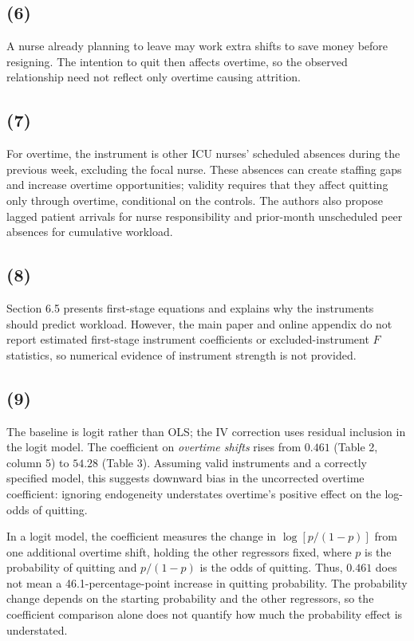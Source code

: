 \documentclass[11pt]{article}
\begin{document}
\subsection{(6)}
A nurse already planning to leave may work extra shifts to save money
before resigning. The intention to quit then affects overtime, so the
observed relationship need not reflect only overtime causing attrition.

\subsection{(7)}
For overtime, the instrument is other ICU nurses' scheduled absences
during the previous week, excluding the focal nurse. These absences can
create staffing gaps and increase overtime opportunities; validity requires
that they affect quitting only through overtime, conditional on the controls.
The authors also propose lagged patient arrivals for nurse responsibility
and prior-month unscheduled peer absences for cumulative workload.

\subsection{(8)}
Section 6.5 presents first-stage equations and explains why the instruments
should predict workload. However, the main paper and online appendix do
not report estimated first-stage instrument coefficients or
excluded-instrument $F$ statistics, so numerical evidence of instrument
strength is not provided.

\subsection{(9)}
The baseline is logit rather than OLS; the IV correction uses residual
inclusion in the logit model. The coefficient on \emph{overtime shifts}
rises from $0.461$ (Table 2, column 5) to $54.28$ (Table 3). Assuming
valid instruments and a correctly specified model, this suggests downward
bias in the uncorrected overtime coefficient: ignoring endogeneity
understates overtime's positive effect on the log-odds of quitting.

In a logit model, the coefficient measures the change in
$\log[p/(1-p)]$ from one additional overtime shift, holding the other
regressors fixed, where $p$ is the probability of quitting and $p/(1-p)$
is the odds of quitting. Thus, $0.461$ does not mean a 46.1-percentage-point
increase in quitting probability. The probability change depends on the
starting probability and the other regressors, so the coefficient comparison
alone does not quantify how much the probability effect is understated.
\end{document}
